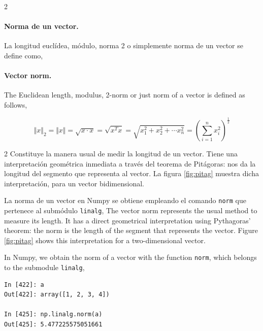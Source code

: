 \begin{paracol}{2}
\paragraph{Norma de un vector.} La longitud euclídea, módulo,  norma 2 o simplemente norma  de un vector se define como,
\switchcolumn
\paragraph{Vector norm.} The Euclidean length, modulus, 2-norm or just norm of a vector is defined as follows,
\end{paracol}
\begin{equation*}
\Vert x \Vert_2 =\Vert x \Vert =\sqrt{x\cdot x}=\sqrt{x^Tx}=\sqrt{x_1^2+x_2^2+\cdots x_n^2}=\left( \sum_{i=1}^nx_i^2 \right)^\frac{1}{2}
\end{equation*}
\begin{paracol}{2}
Constituye la manera usual de medir la longitud de un vector. Tiene una interpretación geométrica inmediata a través del teorema de Pitágoras: nos da la longitud del segmento que representa al vector. La figura \ref{fig:pitag} muestra dicha interpretación, para un vector bidimensional.

La norma de un vector en Numpy se obtiene empleando el  comando \texttt{norm} que pertenece al submódulo \texttt{linalg},
\switchcolumn
The vector norm represents the usual method to measure its length. It has a direct geometrical interpretation using Pythagoras' theorem: the norm is the length of the segment that represents the vector. Figure \ref{fig:pitag} shows this interpretation for a two-dimensional vector.

In Numpy, we obtain the norm of a vector with the function \texttt{norm}, which belongs to the submodule \texttt{linalg},
\end{paracol}
\begin{center}
    \begin{minipage}{0.3\textwidth}
        \begin{verbatim}
In [422]: a
Out[422]: array([1, 2, 3, 4])

In [425]: np.linalg.norm(a)
Out[425]: 5.477225575051661
\end{verbatim}
\end{minipage}
\end{center}

